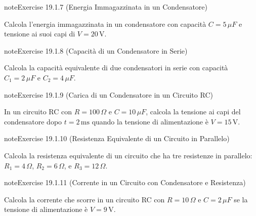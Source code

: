 \documentclass[letterpaper,10pt,italian]{jupyterBook}
\begin{document}
\begin{sphinxadmonition}{note}{Exercise 19.1.7 (Energia Immagazzinata in un Condensatore)}



\sphinxAtStartPar
Calcola l’energia immagazzinata in un condensatore con capacità \(C = 5 \, \mu F\) e tensione ai suoi capi di \(V = 20 \, \text{V}\).
\end{sphinxadmonition}
 \label{exercise:ch/electromagnetism/circuits-electric-problems-exercise-7}

\begin{sphinxadmonition}{note}{Exercise 19.1.8 (Capacità di un Condensatore in Serie)}



\sphinxAtStartPar
Calcola la capacità equivalente di due condensatori in serie con capacità \(C_1 = 2 \, \mu F\) e \(C_2 = 4 \, \mu F\).
\end{sphinxadmonition}
 \label{exercise:ch/electromagnetism/circuits-electric-problems-exercise-8}

\begin{sphinxadmonition}{note}{Exercise 19.1.9 (Carica di un Condensatore in un Circuito RC)}



\sphinxAtStartPar
In un circuito RC con \(R = 100 \, \Omega\) e \(C = 10 \, \mu F\), calcola la tensione ai capi del condensatore dopo \(t = 2 \, \text{ms}\) quando la tensione di alimentazione è \(V = 15 \, \text{V}\).
\end{sphinxadmonition}
 \label{exercise:ch/electromagnetism/circuits-electric-problems-exercise-9}

\begin{sphinxadmonition}{note}{Exercise 19.1.10 (Resistenza Equivalente di un Circuito in Parallelo)}



\sphinxAtStartPar
Calcola la resistenza equivalente di un circuito che ha tre resistenze in parallelo: \(R_1 = 4 \, \Omega\), \(R_2 = 6 \, \Omega\), e \(R_3 = 12 \, \Omega\).
\end{sphinxadmonition}
 \label{exercise:ch/electromagnetism/circuits-electric-problems-exercise-10}

\begin{sphinxadmonition}{note}{Exercise 19.1.11 (Corrente in un Circuito con Condensatore e Resistenza)}



\sphinxAtStartPar
Calcola la corrente che scorre in un circuito RC con \(R = 10 \, \Omega\) e \(C = 2 \, \mu F\) se la tensione di alimentazione è \(V = 9 \, \text{V}\).
\end{sphinxadmonition}
\end{document}
